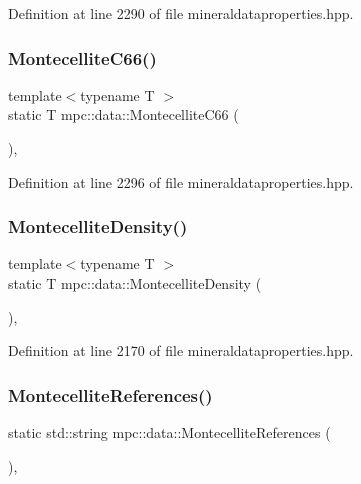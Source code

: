 Definition at line 2290 of file mineraldataproperties.\+hpp.

\mbox{\label{namespacempc_1_1data_ae27d463fdc11aa222d7628d2887e548d}} 
\subsubsection{\texorpdfstring{Montecellite\+C66()}{MontecelliteC66()}}
{\footnotesize\ttfamily template$<$typename T $>$ \\
static T mpc\+::data\+::\+Montecellite\+C66 (\begin{DoxyParamCaption}{ }\end{DoxyParamCaption})\hspace{0.3cm}{\ttfamily [inline]}, {\ttfamily [static]}}



Definition at line 2296 of file mineraldataproperties.\+hpp.

\mbox{\label{namespacempc_1_1data_a853981b197dcdacf81d3691a4b45609c}} 
\subsubsection{\texorpdfstring{Montecellite\+Density()}{MontecelliteDensity()}}
{\footnotesize\ttfamily template$<$typename T $>$ \\
static T mpc\+::data\+::\+Montecellite\+Density (\begin{DoxyParamCaption}{ }\end{DoxyParamCaption})\hspace{0.3cm}{\ttfamily [inline]}, {\ttfamily [static]}}



Definition at line 2170 of file mineraldataproperties.\+hpp.

\mbox{\label{namespacempc_1_1data_abaf7bc3a2916436ace6cbf41d2fd737a}} 
\subsubsection{\texorpdfstring{Montecellite\+References()}{MontecelliteReferences()}}
{\footnotesize\ttfamily static std\+::string mpc\+::data\+::\+Montecellite\+References (\begin{DoxyParamCaption}{ }\end{DoxyParamCaption})\hspace{0.3cm}{\ttfamily [inline]}, {\ttfamily [static]}}



